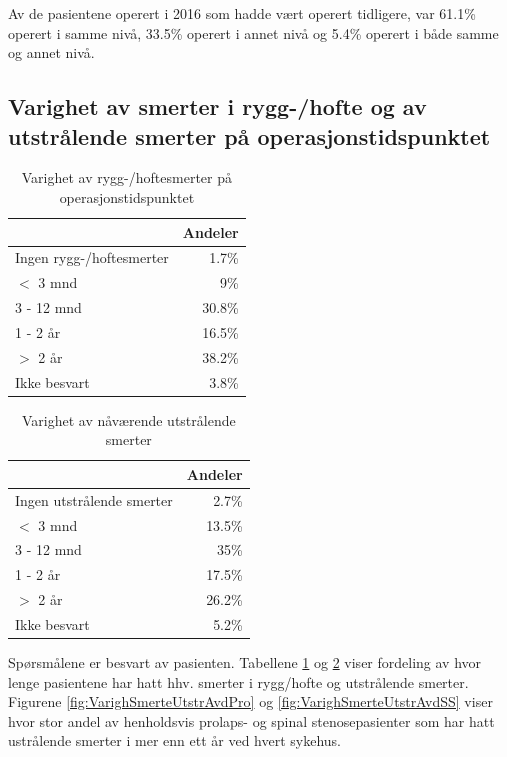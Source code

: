 \documentclass [norsk,a4paper,twoside]{article}\usepackage[]{graphicx}\usepackage[]{color}
\begin{document}
Av de pasientene operert i 2016 som hadde vært operert tidligere, var 61.1\% 
operert i samme nivå, 33.5\% 
operert i annet nivå og 5.4\% 
operert i både samme og annet nivå. 





\subsection{Varighet av smerter i rygg-/hofte og av utstrålende smerter på operasjonstidspunktet}

\begin{table}[ht]
\centering
\begin{tabular}{lr}
  \hline
 & Andeler \\ 
  \hline
Ingen rygg-/hoftesmerter & 1.7\% \\ 
  $<$ 3 mnd & 9\% \\ 
  3 - 12 mnd & 30.8\% \\ 
  1 - 2 år & 16.5\% \\ 
  $>$ 2 år & 38.2\% \\ 
  Ikke besvart & 3.8\% \\ 
   \hline
\end{tabular}
\caption{Varighet av rygg-/hoftesmerter på operasjonstidspunktet} 
\label{tab:SmRH}
\end{table}
\begin{table}[ht]
\centering
\begin{tabular}{lr}
  \hline
 & Andeler \\ 
  \hline
Ingen utstrålende smerter & 2.7\% \\ 
  $<$ 3 mnd & 13.5\% \\ 
  3 - 12 mnd & 35\% \\ 
  1 - 2 år & 17.5\% \\ 
  $>$ 2 år & 26.2\% \\ 
  Ikke besvart & 5.2\% \\ 
   \hline
\end{tabular}
\caption{Varighet av nåværende utstrålende smerter} 
\label{tab:Utstr}
\end{table}

Spørsmålene er besvart av pasienten.
Tabellene \ref{tab:SmRH}  og \ref{tab:Utstr} viser fordeling av hvor lenge pasientene har hatt 
hhv. smerter i rygg/hofte og utstrålende smerter. Figurene \ref{fig:VarighSmerteUtstrAvdPro} og \ref{fig:VarighSmerteUtstrAvdSS} viser hvor stor andel av henholdsvis prolaps- og spinal stenosepasienter som har hatt ustrålende smerter i mer enn ett år ved hvert sykehus. 
\end{document}
